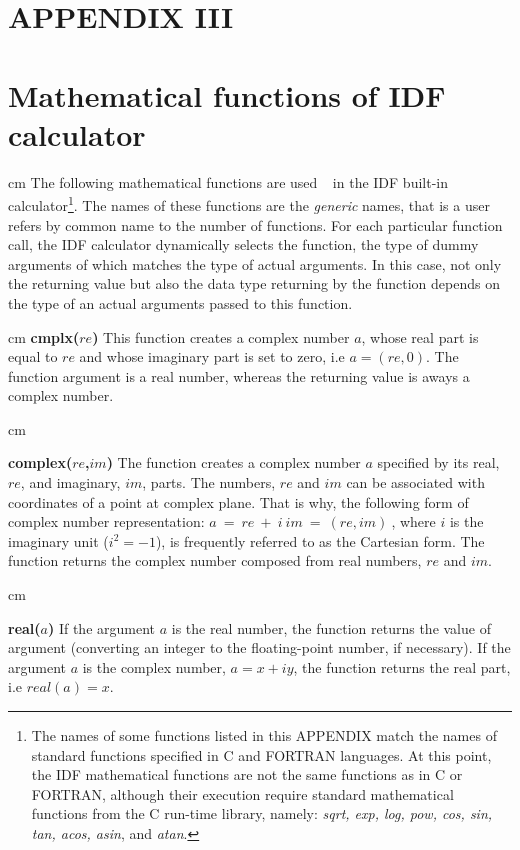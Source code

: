 \newpage
\section*{APPENDIX III}
\section*{Mathematical functions of IDF calculator}

 cm
The following mathematical functions are used $~~$ in
the IDF built-in $~$ calculator\footnote{
The names of some functions listed in this APPENDIX
match the names of standard functions specified
in  C and FORTRAN languages. At this point,
the IDF mathematical functions are not the same functions 
as in C or FORTRAN, 
although their execution require  standard mathematical functions 
from the C run-time library, namely:
{\it sqrt, exp, log, pow, cos, sin, tan,
acos, asin}, and {\it atan}.
}.
The names of these functions are the {\it generic} names,
that is a user refers by common name to the number of functions.
For each particular function call, the IDF calculator
dynamically selects the function, the type of dummy arguments of which
matches the type of actual arguments.
In this case, not only the returning value but also the data type returning by the function depends on the type of an actual arguments 
passed to this function.

 cm
{\bf cmplx($re$)}\hfil\break
This function creates a complex number $a$, whose
real part is equal to $re$ and whose imaginary part
is set to zero, i.e $a=(re,0)$.
The function argument is a real number, whereas the returning
value is aways a complex number.

 cm

{\bf complex($re$,$im$)}\hfil\break
The function creates a complex number $a$ specified by its
real, $re$, and imaginary, $im$, parts.
The numbers, $re$ and $im$ can be associated with
coordinates of a point at complex plane. That is why,
the following form of complex number representation:
$a\ =\ re\ +\ i\ im\ =\ (re,im)\ $, 
where $i$ is the imaginary unit ($i^2=-1$), 
is frequently referred to as the Cartesian form.
The function returns the complex number composed from real
numbers, $re$ and $im$.

 cm

{\bf real($a$)}\hfil\break
If the argument $a$ is the real number,
the function returns the value of argument (converting an
integer to the floating-point number, if necessary).
If the argument $a$ is the complex number, $a=x+iy$,
the function returns the real part, i.e $real(a)=x$.

